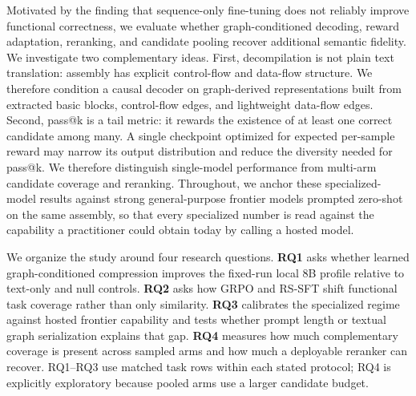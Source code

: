 \documentclass[11pt]{article}
\begin{document}
Motivated by the finding that sequence-only fine-tuning does not reliably improve functional correctness, we evaluate whether graph-conditioned decoding, reward adaptation, reranking, and candidate pooling recover additional semantic fidelity. We investigate two complementary ideas. First, decompilation is not plain text translation: assembly has explicit control-flow and data-flow structure. We therefore condition a causal decoder on graph-derived representations built from extracted basic blocks, control-flow edges, and lightweight data-flow edges. Second, pass@k is a tail metric: it rewards the existence of at least one correct candidate among many. A single checkpoint optimized for expected per-sample reward may narrow its output distribution and reduce the diversity needed for pass@k. We therefore distinguish single-model performance from multi-arm candidate coverage and reranking. Throughout, we anchor these specialized-model results against strong general-purpose frontier models prompted zero-shot on the same assembly, so that every specialized number is read against the capability a practitioner could obtain today by calling a hosted model.

We organize the study around four research questions. \textbf{RQ1} asks whether learned graph-conditioned compression improves the fixed-run local 8B profile relative to text-only and null controls. \textbf{RQ2} asks how GRPO and RS-SFT shift functional task coverage rather than only similarity. \textbf{RQ3} calibrates the specialized regime against hosted frontier capability and tests whether prompt length or textual graph serialization explains that gap. \textbf{RQ4} measures how much complementary coverage is present across sampled arms and how much a deployable reranker can recover. RQ1--RQ3 use matched task rows within each stated protocol; RQ4 is explicitly exploratory because pooled arms use a larger candidate budget.
\end{document}
